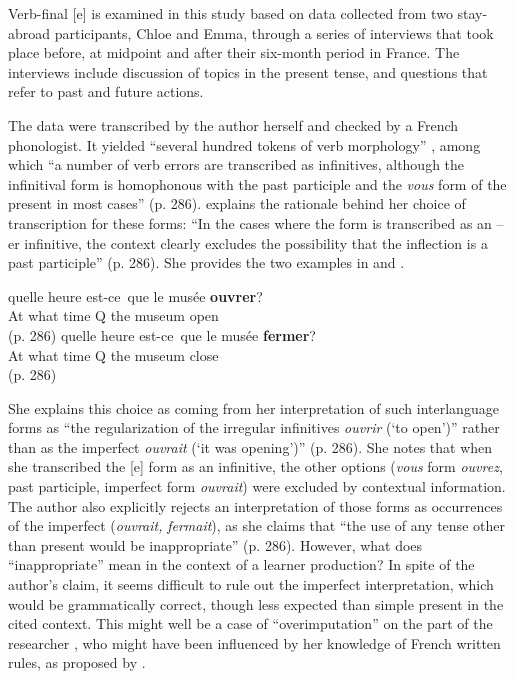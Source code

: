 \documentclass[output=paper,colorlinks,citecolor=brown,modfonts,nonflat]{../langscibook}
\begin{document}
Verb-final [e] is examined in this study based on data collected from two stay-abroad participants, Chloe and Emma, through a series of interviews that took place before, at midpoint and after their six-month period in France. The interviews include discussion of topics in the present tense, and questions that refer to past and future actions. 

The data were transcribed by the author herself and checked by a French phonologist. It yielded “several hundred tokens of verb morphology” \citep[285]{Herschensohn2001}, among which “a number of verb errors are transcribed as infinitives, although the infinitival form is homophonous with the past participle and the \textit{vous} form of the present in most cases” (p. 286). \citeauthor{Herschensohn2001} explains the rationale behind her choice of transcription for these forms: “In the cases where the form is transcribed as an –er infinitive, the context clearly excludes the possibility that the inflection is a past participle” (p. 286). She provides the two examples in  and .

\begin{exe}
\ex%
    \label{ex:leclerq:2}
 {quelle} {heure} {est-ce}~{que} {le} {musée} \textbf{{ouvrer}}?\\
       At            what time    Q              the museum open\\
       (p. 286)
\ex%
    \label{ex:leclerq:3}
 {quelle} {heure} {est-ce}~{que} {le} {musée} \textbf{{fermer}}?\\
                At what time    Q              the museum  close\\
                (p. 286)
\end{exe}

She explains this choice as coming from her interpretation of such interlanguage forms as “the regularization of the irregular infinitives \textit{ouvrir} (‘to open’)” rather than as the imperfect \textit{ouvrait} (‘it was opening’)” (p. 286). She notes that when she transcribed the [e] form as an infinitive, the other options (\textit{vous} form \textit{ouvrez}, past participle, imperfect form \textit{ouvrait}) were excluded by contextual information. The author also explicitly rejects an interpretation of those forms as occurrences of the imperfect (\textit{ouvrait,} \textit{fermait}), as she claims that “the use of any tense other than present would be inappropriate” (p. 286). However, what does “inappropriate” mean in the context of a learner production? In spite of the author’s claim, it seems difficult to rule out the imperfect interpretation, which would be grammatically correct, though less expected than simple present in the cited context. This might well be a case of “overimputation” on the part of the researcher \citep{Nickerson1999}, who might have been influenced by her knowledge of French written rules, as proposed by \citet{Jaffré2006}.
\end{document}
